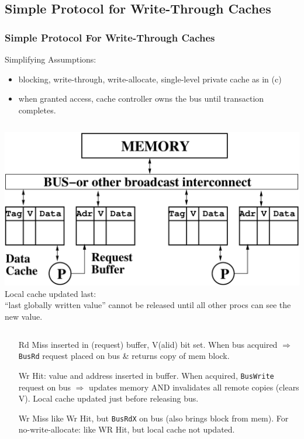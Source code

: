 \documentclass{beamer}
\newcommand{\emp}[1]{\textcolor{DikuRed}{ #1}}
\begin{document}
\subsection{Simple Protocol for Write-Through Caches}

\begin{frame}[fragile,t]
\frametitle{Simple Protocol For Write-Through Caches}

Simplifying Assumptions:
\begin{scriptsize}
\begin{itemize}
    \item blocking, write-through, write-allocate, single-level private cache as in (c) 
    \item when granted access, cache controller owns the bus until transaction completes.
\end  {itemize}
\end {scriptsize}
\smallskip

\begin{columns}
\includegraphics[width=35ex]{Figures/FigsInfCoherence/SMPreqbuff}
\pause
Local cache updated last:\\
\emp{``last globally written value''
cannot be released until all
other procs can see the new value}.
\end{columns} 

\smallskip
\begin{itemize}
    \item[Rd Miss] inserted in (request) buffer, V(alid) bit set.
    When bus acquired $\Rightarrow$ {\tt BusRd} request placed on bus \& returns copy of mem block.\pause

    \item[Wr Hit:] value and address inserted in buffer. \pause When acquired, 
    {\tt BusWrite} request on bus $\Rightarrow$ updates memory AND \alert{invalidates all
    remote copies} (clears V). \emp{Local cache updated just before releasing bus.}

    \item[Wr Miss] like Wr Hit, but {\tt BusRdX} on bus (also brings block from mem).
    For no-write-allocate: like WR Hit, but local cache not updated.

\end  {itemize}

\end{frame}
\end{document}
